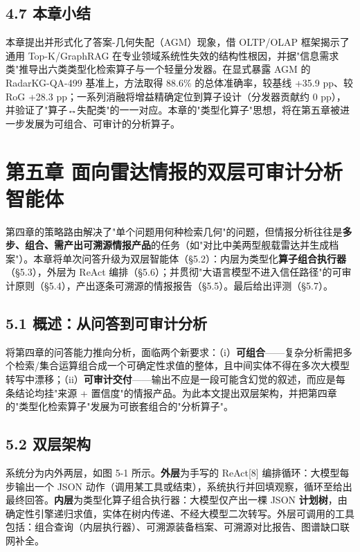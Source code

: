 \documentclass[12pt,a4paper]{ctexart}
\begin{document}
\subsection*{4.7 本章小结}

本章提出并形式化了答案-几何失配（AGM）现象，借 OLTP/OLAP 框架揭示了通用 Top-K/GraphRAG 在专业领域系统性失效的结构性根因，并据"信息需求类"推导出六类类型化检索算子与一个轻量分发器。在显式暴露 AGM 的 RadarKG-QA-499 基准上，方法取得 88.6\% 的总体准确率，较基线 +35.9 pp、较 RoG +28.3 pp；一系列消融将增益精确定位到算子设计（分发器贡献约 0 pp），并验证了"算子↔失配类"的一一对应。本章的"类型化算子"思想，将在第五章被进一步发展为可组合、可审计的分析算子。



\section*{第五章 面向雷达情报的双层可审计分析智能体}

第四章的策略路由解决了"单个问题用何种检索几何"的问题，但情报分析往往是\textbf{多步、组合、需产出可溯源情报产品}的任务（如"对比中美两型舰载雷达并生成档案"）。本章将单次问答升级为双层智能体（§5.2）：内层为类型化\textbf{算子组合执行器}（§5.3），外层为 ReAct 编排（§5.6）；并贯彻"大语言模型不进入信任路径"的可审计原则（§5.4），产出逐条可溯源的情报报告（§5.5）。最后给出评测（§5.7）。

\subsection*{5.1 概述：从问答到可审计分析}

将第四章的问答能力推向分析，面临两个新要求：（i）\textbf{可组合}——复杂分析需把多个检索/集合运算组合成一个可确定性求值的整体，且中间实体不得在多次大模型转写中漂移；（ii）\textbf{可审计交付}——输出不应是一段可能含幻觉的叙述，而应是每条结论均挂"来源 + 置信度"的情报产品。为此本文提出双层架构，并把第四章的"类型化检索算子"发展为可嵌套组合的"分析算子"。

\subsection*{5.2 双层架构}

系统分为内外两层，如图 5-1 所示。\textbf{外层}为手写的 ReAct[8] 编排循环：大模型每步输出一个 JSON 动作（调用某工具或结束），系统执行并回填观察，循环至给出最终回答。\textbf{内层}为类型化算子组合执行器：大模型仅产出一棵 JSON \textbf{计划树}，由确定性引擎递归求值，实体在树内传递、不经大模型二次转写。外层可调用的工具包括：组合查询（内层执行器）、可溯源装备档案、可溯源对比报告、图谱缺口联网补全。
\end{document}
